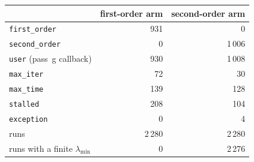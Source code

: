 \begin{tabular}{@{}lrr@{}}
\toprule
& first-order arm & second-order arm \\
\midrule
\texttt{first\_order} & 931 & 0 \\
\texttt{second\_order} & 0 & 1\,006 \\
\texttt{user} (pass~g callback) & 930 & 1\,008 \\
\texttt{max\_iter} & 72 & 30 \\
\texttt{max\_time} & 139 & 128 \\
\texttt{stalled} & 208 & 104 \\
\texttt{exception} & 0 & 4 \\
\midrule
runs & 2\,280 & 2\,280 \\
runs with a finite $\lambda_{\min}$ & 0 & 2\,276 \\
\bottomrule
\end{tabular}

